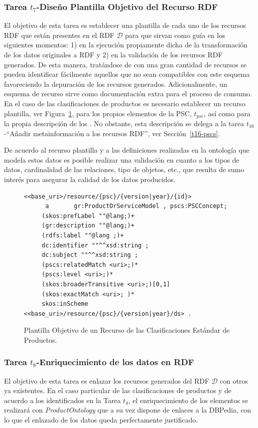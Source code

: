 \subsubsection{Tarea $t_7$-Diseño Plantilla Objetivo del Recurso RDF}
El objetivo de esta tarea es establecer una plantilla de cada uno de los recursos RDF que están 
presentes en el \dataset \gls{RDF} $\mathcal{D}$ para que sirvan como guía en los siguientes momentos: 1) en la ejecución propiamente dicha 
de la transformación de los datos originales a RDF y 2) en la validación de los recursos RDF generados. De esta manera, 
tratándose de \datasets con una gran cantidad de recursos se pueden identificar fácilmente aquellos que no sean 
compatibles con este esquema favoreciendo la depuración de los recursos generados. Adicionalmente, un esquema de 
recurso sirve como documentación extra para el proceso de consumo. En el caso de las clasificaciones de productos es necesario 
establecer un recurso plantilla, ver Figura~\ref{fig:pscs-template}, para los propios elementos de la \gls{PSC}, $t_{psc}$, así como para la propia descripción 
de los \datasets. No obstante, esta descripción se delega a la tarea $t_{16}$-``Añadir metainformación a los recursos RDF'', 
ver Sección~\ref{t16-pscs}.

De acuerdo al recurso plantilla y a las definiciones realizadas en la ontología que modela estos datos 
es posible realizar una validación en cuanto a los tipos de datos, cardinalidad de las relaciones, tipo de objetos, etc., que 
resulta de sumo interés para asegurar la calidad de los datos producidos.

\begin{figure}[!htp]
\begin{lstlisting} 
<<base_uri>/resource/{psc}/{version|year}/{id}>
      a       gr:ProductOrServiceModel , pscs:PSCConcept;
     (skos:prefLabel ""@lang;)+
     (gr:description ""@lang;)+
     (rdfs:label ""@lang ;)+
     dc:identifier ""^^xsd:string ;
     dc:subject ""^^xsd:string ;
     (pscs:relatedMatch <uri>;)*
     (pscs:level <uri>;)*
     (skos:broaderTransitive <uri>;)[0,1]
     (skos:exactMatch <uri>; )*
     skos:inScheme <<base_uri>/resource/{psc}/{version|year}/ds> .	
\end{lstlisting}
	\caption{Plantilla Objetivo de un Recurso de las Clasificaciones Estándar de Productos.}
	\label{fig:pscs-template}
\end{figure}



\subsubsection{Tarea $t_8$-Enriquecimiento de los datos en RDF}\label{t8-pscs}
El objetivo de esta tarea es enlazar los recursos generados del \dataset RDF $\mathcal{D}$ con otros 
ya existentes. En el caso particular de las clasificaciones de productos y de acuerdo a los \datasets 
identificados en la Tarea $t_4$, el enriquecimiento de los elementos se realizará con \textit{ProductOntology} que 
a su vez dispone de enlaces a la DBPedia, con lo que el enlazado de los datos queda perfectamente justificado. 

